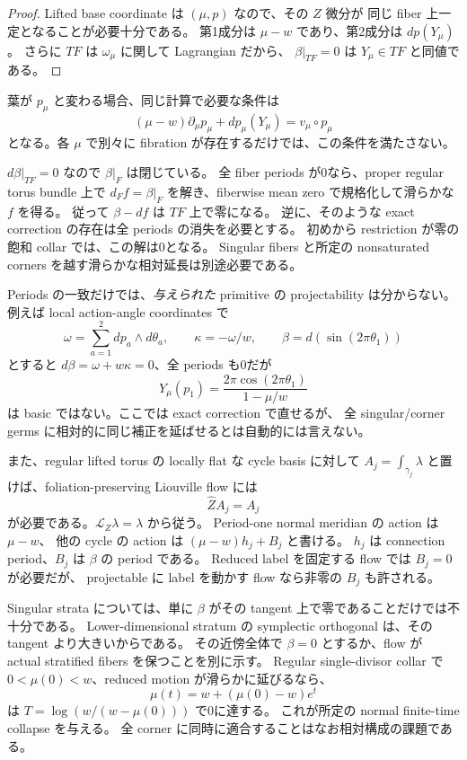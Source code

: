 \begin{proof}
Lifted base coordinate は $(\mu,p)$ なので、その $Z$ 微分が
同じ fiber 上一定となることが必要十分である。
第1成分は $\mu-w$ であり、第2成分は $dp(Y_\mu)$。
さらに $TF$ は $\omega_\mu$ に関して Lagrangian だから、
$\beta|_{TF}=0$ は $Y_\mu\in TF$ と同値である。
\end{proof}

葉が $p_\mu$ と変わる場合、同じ計算で必要な条件は
\[
(\mu-w)\partial_\mu p_\mu+dp_\mu(Y_\mu)=v_\mu\circ p_\mu
\]
となる。各 $\mu$ で別々に fibration が存在するだけでは、この条件を満たさない。

$d\beta|_{TF}=0$ なので $\beta|_F$ は閉じている。
全 fiber periods が0なら、proper regular torus bundle 上で
$d_Ff=\beta|_F$ を解き、fiberwise mean zero で規格化して滑らかな $f$ を得る。
従って $\beta-df$ は $TF$ 上で零になる。
逆に、そのような exact correction の存在は全 periods の消失を必要とする。
初めから restriction が零の飽和 collar では、この解は0となる。
Singular fibers と所定の nonsaturated corners を越す滑らかな相対延長は別途必要である。

Periods の一致だけでは、\emph{与えられた} primitive の projectability は分からない。
例えば local action-angle coordinates で
\[
\omega=\sum_{a=1}^2dp_a\wedge d\theta_a,\qquad
\kappa=-\omega/w,\qquad
\beta=d(\sin(2\pi\theta_1))
\]
とすると $d\beta=\omega+w\kappa=0$、全 periods も0だが
\[
Y_\mu(p_1)=\frac{2\pi\cos(2\pi\theta_1)}{1-\mu/w}
\]
は basic ではない。ここでは exact correction で直せるが、
全 singular/corner germs に相対的に同じ補正を延ばせるとは自動的には言えない。

また、regular lifted torus の locally flat な cycle basis に対して
$A_j=\int_{\gamma_j}\lambda$ と置けば、foliation-preserving Liouville flow には
\[
\widehat Z A_j=A_j
\]
が必要である。$\mathcal L_Z\lambda=\lambda$ から従う。
Period-one normal meridian の action は $\mu-w$、
他の cycle の action は $(\mu-w)h_j+B_j$ と書ける。
$h_j$ は connection period、$B_j$ は $\beta$ の period である。
Reduced label を固定する flow では $B_j=0$ が必要だが、
projectable に label を動かす flow なら非零の $B_j$ も許される。

Singular strata については、単に $\beta$ がその tangent 上で零であることだけでは不十分である。
Lower-dimensional stratum の symplectic orthogonal は、その tangent より大きいからである。
その近傍全体で $\beta=0$ とするか、flow が actual stratified fibers を保つことを別に示す。
Regular single-divisor collar で $0<\mu(0)<w$、reduced motion が滑らかに延びるなら、
\[
\mu(t)=w+(\mu(0)-w)e^t
\]
は $T=\log\!\left(w/(w-\mu(0))\right)$ で0に達する。
これが所定の normal finite-time collapse を与える。
全 corner に同時に適合することはなお相対構成の課題である。

